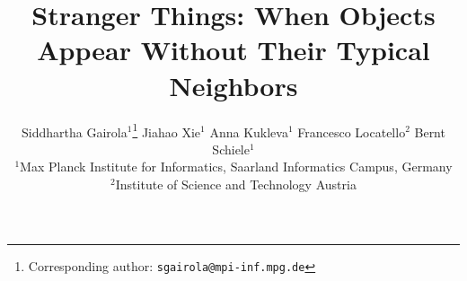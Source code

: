 \documentclass{article}
\title{Stranger Things: When Objects Appear Without Their Typical Neighbors}
\author{%
  Siddhartha Gairola$^{1}$\thanks{Corresponding author: \texttt{sgairola@mpi-inf.mpg.de}}\hspace{0.5em} Jiahao Xie$^{1}$\hspace{0.5em} Anna Kukleva$^{1}$\hspace{0.5em} Francesco Locatello$^{2}$\hspace{0.5em} Bernt Schiele$^{1}$ \\
  $^{1}$Max Planck Institute for Informatics, Saarland Informatics Campus, Germany \\
  $^{2}$Institute of Science and Technology Austria \\
}
\begin{document}
\maketitle






\clearpage



{
    \small
    
    
}


\clearpage
\appendix

\end{document}
